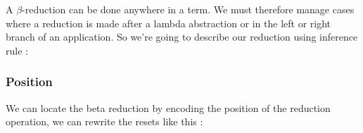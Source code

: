  A $\beta$-reduction can be done anywhere in a term. We must therefore manage
  cases where a reduction is made after a lambda abstraction or in the left or
  right branch of an application. So we're going to describe our reduction
  using inference rule :




  \subsubsection{Position}

  We can locate the beta reduction by encoding the position of the reduction
  operation, we can rewrite the resets like this :


